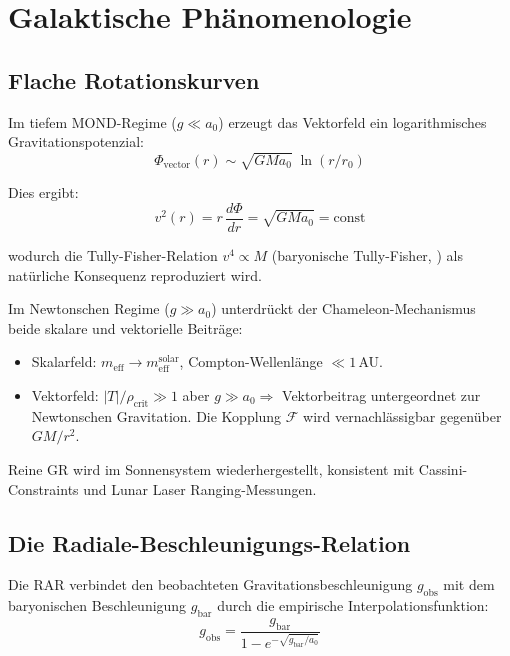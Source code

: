 \documentclass[aps,prd,twocolumn,superscriptaddress,nofootinbib]{revtex4-2}
\begin{document}
\section{Galaktische Ph\"anomenologie}
\label{sec:phenomenology}
\subsection{Flache Rotationskurven}
\label{sec:rotation_curves}

Im tiefem MOND-Regime ($g \ll a_0$) erzeugt das Vektorfeld ein logarithmisches Gravitationspotenzial:
\begin{equation}
\Phi_{\mathrm{vector}}(r) \sim \sqrt{G M a_0}\;\ln(r/r_0)
\label{eq:log_potential}
\end{equation}

Dies ergibt:
\begin{equation}
v^2(r) = r\,\frac{d\Phi}{dr} = \sqrt{G M a_0} = \mathrm{const}
\end{equation}

wodurch die Tully-Fisher-Relation $v^4 \propto M$ (baryonische Tully-Fisher, \cite{McGaugh2012}) als nat\"urliche Konsequenz reproduziert wird.

Im Newtonschen Regime ($g \gg a_0$) unterdr\"uckt der Chameleon-Mechanismus beide skalare und vektorielle Beitr\"age:
\begin{itemize}
\item Skalarfeld: $m_{\mathrm{eff}} \to m_{\mathrm{eff}}^{\mathrm{solar}}$, Compton-Wellenl\"ange $\ll 1$\,AU.
\item Vektorfeld: $|T|/\rho_{\mathrm{crit}} \gg 1$ aber $g \gg a_0 \Rightarrow$ Vektorbeitrag untergeordnet zur Newtonschen Gravitation. Die Kopplung $\mathcal{F}$ wird vernachl\"assigbar gegen\"uber $GM/r^2$.
\end{itemize}

Reine GR wird im Sonnensystem wiederhergestellt, konsistent mit Cassini-Constraints \cite{Bertotti2003} und Lunar Laser Ranging-Messungen.

\subsection{Die Radiale-Beschleunigungs-Relation}
\label{sec:rar}

Die RAR \cite{McGaugh2016} verbindet den beobachteten Gravitationsbeschleunigung $g_{\mathrm{obs}}$ mit dem baryonischen Beschleunigung $g_{\mathrm{bar}}$ durch die empirische Interpolationsfunktion:
\begin{equation}
g_{\mathrm{obs}} = \frac{g_{\mathrm{bar}}}{1 - e^{-\sqrt{g_{\mathrm{bar}}/a_0}}}
\label{eq:rar}
\end{equation}
\end{document}
